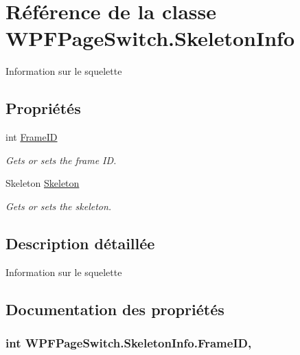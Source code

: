 \hypertarget{class_w_p_f_page_switch_1_1_skeleton_info}{\section{Référence de la classe W\+P\+F\+Page\+Switch.\+Skeleton\+Info}
\label{class_w_p_f_page_switch_1_1_skeleton_info}
}


Information sur le squelette  


\subsection*{Propriétés}
\begin{DoxyCompactItemize}
\item 
int \hyperlink{class_w_p_f_page_switch_1_1_skeleton_info_a8fcb5e3dd96d1777bc8c6805135d822e}{Frame\+I\+D}
\begin{DoxyCompactList}\small\item\em Gets or sets the frame I\+D. \end{DoxyCompactList}\item 
Skeleton \hyperlink{class_w_p_f_page_switch_1_1_skeleton_info_a75b7e8daeca9c2bb1d9782edb62522dc}{Skeleton}
\begin{DoxyCompactList}\small\item\em Gets or sets the skeleton. \end{DoxyCompactList}\end{DoxyCompactItemize}


\subsection{Description détaillée}
Information sur le squelette 



\subsection{Documentation des propriétés}
\hypertarget{class_w_p_f_page_switch_1_1_skeleton_info_a8fcb5e3dd96d1777bc8c6805135d822e}{
\subsubsection[{Frame\+I\+D}]{\setlength{\rightskip}{0pt plus 5cm}int W\+P\+F\+Page\+Switch.\+Skeleton\+Info.\+Frame\+I\+D\hspace{0.3cm}{\ttfamily [get]}, {\ttfamily [set]}}}\label{class_w_p_f_page_switch_1_1_skeleton_info_a8fcb5e3dd96d1777bc8c6805135d822e}


